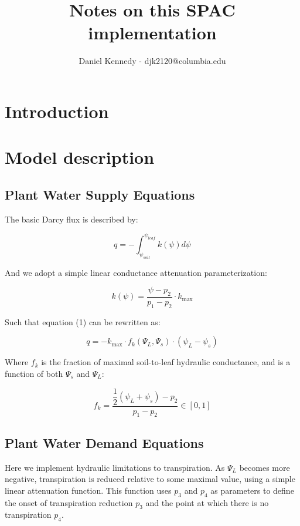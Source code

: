 \documentclass[11pt]{article}
\title{Notes on this SPAC implementation\large}
\author{Daniel Kennedy - djk2120@columbia.edu 
}
\begin{document}
\maketitle

\section{Introduction}

\clearpage
\section{Model description}

\subsection{Plant Water Supply Equations}

The basic Darcy flux is described by:

\begin{equation}
q = -\int_{\psi_{soil}}^{\psi_{leaf}}{k\left(\psi\right)d\psi}
\end{equation}

And we adopt a simple linear conductance attenuation parameterization:

\begin{equation}
k(\psi) = \dfrac{\psi - p_2}{p_1 - p_2} \cdot k_\text{max}
\end{equation}

Such that equation (1) can be rewritten as:

\begin{equation}
q = -k_\text{max}\cdot f_k\left(\Psi_L,\Psi_s\right) \cdot \left(\psi_L-\psi_s\right)
\end{equation}

Where $f_k$ is the fraction of maximal soil-to-leaf hydraulic conductance, and is a function of both $\Psi_s$ and $\Psi_L$:

\begin{equation}
f_k = \dfrac{\dfrac{1}{2} \left(\psi_L+\psi_s\right) - p_2}{p_1 - p_2} \in \left[0,1\right]
\end{equation}


\clearpage
\subsection{Plant Water Demand Equations}

Here we implement hydraulic limitations to transpiration. As $\Psi_L$ becomes more negative, transpiration is reduced relative to some maximal value, using a simple linear attenuation function. This function uses $p_3$ and $p_4$ as parameters to define the onset of transpiration reduction $p_3$ and the point at which there is no transpiration $p_4$.
\end{document}
